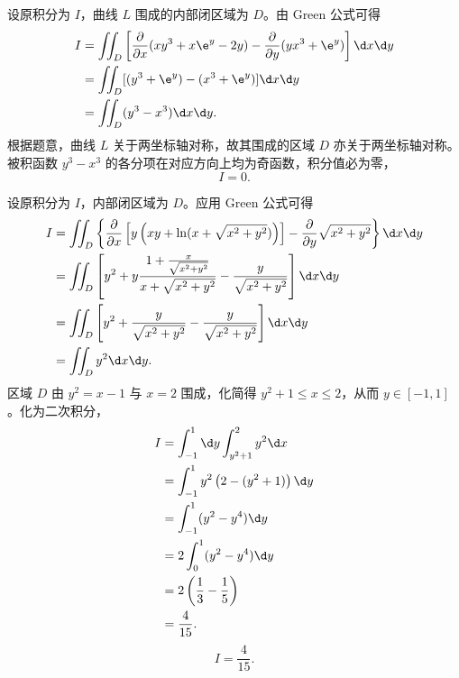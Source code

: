\begin{solution}

    设原积分为 $I$，曲线 $L$ 围成的内部闭区域为 $D$。由 Green 公式可得
    \begin{equation}
        \begin{aligned}
            I & = \iint_D \left[ \frac{\partial}{\partial x}(xy^3+x\e^y-2y) - \frac{\partial}{\partial y}(yx^3+\e^y) \right] \d x \d y \\
              & = \iint_D[ (y^3+\e^y) - (x^3+\e^y) ] \d x \d y                                                                         \\
              & = \iint_D (y^3-x^3) \d x \d y.
        \end{aligned}
    \end{equation}
    根据题意，曲线 $L$ 关于两坐标轴对称，故其围成的区域 $D$ 亦关于两坐标轴对称。被积函数 $y^3-x^3$ 的各分项在对应方向上均为奇函数，积分值必为零，
    \begin{equation}
        I = \boxed{0}.
    \end{equation}


    设原积分为 $I$，内部闭区域为 $D$。应用 Green 公式可得
    \begin{equation}
        \begin{aligned}
            I & = \iint_D \left\{ \frac{\partial}{\partial x} \left[ y \left( xy + \ln(x+\sqrt{x^2+y^2}) \right) \right] - \frac{\partial}{\partial y}\sqrt{x^2+y^2} \right\} \d x \d y \\
              & = \iint_D \left[ y^2 + y \frac{1+\frac{x}{\sqrt{x^2+y^2}}}{x+\sqrt{x^2+y^2}} - \frac{y}{\sqrt{x^2+y^2}} \right] \d x \d y                                               \\
              & = \iint_D \left[ y^2 + \frac{y}{\sqrt{x^2+y^2}} - \frac{y}{\sqrt{x^2+y^2}} \right] \d x \d y                                                                            \\
              & = \iint_D y^2 \d x \d y.
        \end{aligned}
    \end{equation}
    区域 $D$ 由 $y^2 = x-1$ 与 $x = 2$ 围成，化简得 $y^2 + 1 \le x \le 2$，从而 $y \in [-1, 1]$。化为二次积分，
    \begin{equation}
        \begin{aligned}
            I & = \int_{-1}^1 \d y \int_{y^2+1}^2 y^2 \d x        \\
              & = \int_{-1}^1 y^2 \left( 2 - (y^2+1) \right) \d y \\
              & = \int_{-1}^1 (y^2-y^4) \d y                      \\
              & = 2 \int_0^1 (y^2-y^4) \d y                       \\
              & = 2 \left( \frac{1}{3} - \frac{1}{5} \right)      \\
              & = \frac{4}{15}.
        \end{aligned}
    \end{equation}
    \begin{equation}
        I = \boxed{\frac{4}{15}}.
    \end{equation}


\end{solution}
